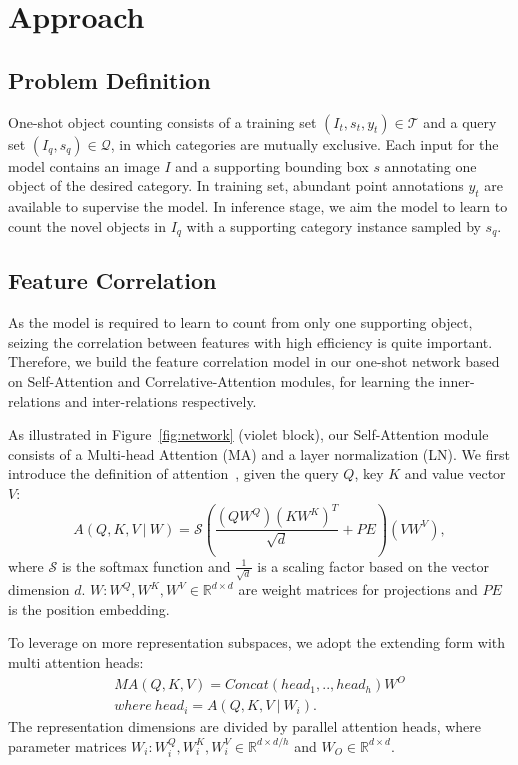 \documentclass{article}
\begin{document}

\section{Approach}

\subsection{Problem Definition}

One-shot object counting consists of a training set $(I_t, s_t, y_t) \in \mathcal{T}$ and a query set $(I_q, s_q) \in \mathcal{Q}$, in which categories are mutually exclusive. Each input for the model contains an image $I$ and a supporting bounding box $s$ annotating one object of the desired category. In training set, abundant point annotations $y_t$ are available to supervise the model. In inference stage, we aim the model to learn to count the novel objects in $I_q$ with a supporting category instance sampled by $s_q$.

\subsection{Feature Correlation}
As the model is required to learn to count from only one supporting object, seizing the correlation between features with high efficiency is quite important. Therefore, we build the feature correlation model in our one-shot network based on Self-Attention and Correlative-Attention modules, for learning the inner-relations and inter-relations respectively. 

As illustrated in Figure~\ref{fig:network} (violet block), our Self-Attention module consists of a Multi-head Attention (MA) and a layer normalization (LN). We first introduce the definition of attention~\cite{vaswani2017attention}, given the query $Q$, key $K$ and value vector $V$:
\begin{equation}
    A(Q, K, V\ |\ W) = \mathcal{S}(\frac{(QW^Q)(KW^K)^T}{\sqrt{d}}+PE)(VW^V),
\end{equation}
where $\mathcal{S}$ is the softmax function and $\frac{1}{\sqrt{d}}$ is a scaling factor based on the vector dimension $d$. $W:W^Q, W^K, W^V \in \mathbb{R}^{d \times d}$ are weight matrices for projections and $PE$ is the position embedding.

To leverage on more representation subspaces, we adopt the extending form with multi attention heads:
\begin{equation}
\begin{aligned}
    MA(Q, K, V) = Concat(head_1,.., head_h)W^O \\
    where\ head_i = A(Q, K, V\ |\ W_i).
\end{aligned}
\end{equation}
The representation dimensions are divided by parallel attention heads, where parameter matrices $W_i:W_i^Q, W_i^K, W_i^V \in \mathbb{R}^{d \times d/h}$ and $W_O \in \mathbb{R}^{d \times d}$.
\end{document}
